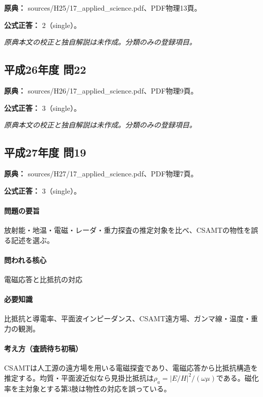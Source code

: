 \noindent\textbf{原典：} sources/H25/17\_applied\_science.pdf、PDF物理13頁。

\textbf{公式正答：} 2（single）。

\par\textit{原典本文の校正と独自解説は未作成。分類のみの登録項目。}

\subsection{平成26年度 問22}
\label{q:h26-reg-applied-22}

\noindent\textbf{原典：} sources/H26/17\_applied\_science.pdf、PDF物理9頁。

\textbf{公式正答：} 3（single）。

\par\textit{原典本文の校正と独自解説は未作成。分類のみの登録項目。}

\subsection{平成27年度 問19}
\label{q:h27-reg-applied-19}

\noindent\textbf{原典：} sources/H27/17\_applied\_science.pdf、PDF物理7頁。

\textbf{公式正答：} 3（single）。

\paragraph{問題の要旨} 放射能・地温・電磁・レーダ・重力探査の推定対象を比べ、CSAMTの物性を誤る記述を選ぶ。

\paragraph{問われる核心} 電磁応答と比抵抗の対応

\paragraph{必要知識} 比抵抗と導電率、平面波インピーダンス、CSAMT遠方場、ガンマ線・温度・重力の観測。

\paragraph{考え方（査読待ち初稿）} CSAMTは人工源の遠方場を用いる電磁探査であり、電磁応答から比抵抗構造を推定する。均質・平面波近似なら見掛比抵抗は\(\rho_a=|E/H|^2/(\omega\mu)\)である。磁化率を主対象とする第3肢は物性の対応を誤っている。

